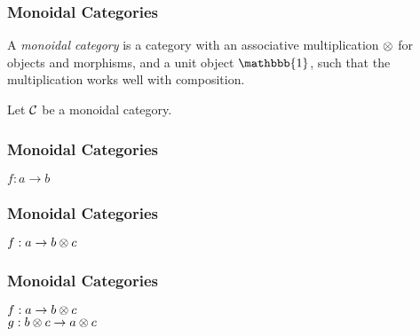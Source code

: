 \begin{frame}
    \frametitle{Monoidal Categories}

    A \textit{monoidal category} is a category with an associative multiplication $\otimes$ for objects and morphisms, and a unit object $\mathbbb{1}$, such that the multiplication works well with composition. \newline

    Let $\mathcal{C}$ be a monoidal category.

\end{frame}

\begin{frame}
    \frametitle{Monoidal Categories}

    \begin{center}
        $f: a \to b$ \\ \vspace{0.5em}
        
    \end{center}

\end{frame}

\begin{frame}
    \frametitle{Monoidal Categories}

    \begin{center}
        $f: a \to b \otimes c$ \\ \vspace{0.5em}
        
    \end{center}
\end{frame}

\begin{frame}
    \frametitle{Monoidal Categories}

    \begin{center}
        $f: a \to b \otimes c$ \\
        $g: b \otimes c \to a \otimes c$ \\ \vspace{0.5em}

    \end{center}
\end{frame}



